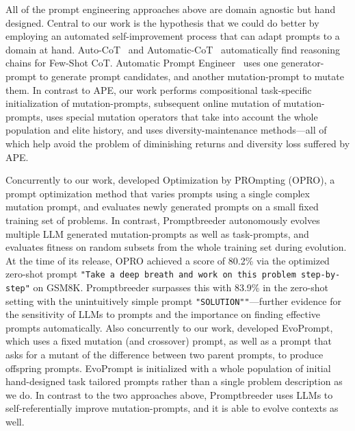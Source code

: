 \documentclass{article} %
\newcommand{\prompt}[1]{\footnotesize{\texttt{"#1"}}\normalsize}
\begin{document}
All of the prompt engineering approaches above are domain agnostic but hand designed. Central to our work is the hypothesis that we could do better by employing an automated self-improvement process that can adapt prompts to a domain at hand. Auto-CoT~\citep{DBLP:conf/iclr/0001Z0S23} and Automatic-CoT~\citep{DBLP:journals/corr/abs-2302-12822} automatically find reasoning chains for Few-Shot CoT. Automatic Prompt Engineer~\citep[APE,][]{zhou2022large} uses one generator-prompt to generate prompt candidates, and another mutation-prompt to mutate them. In contrast to APE, our work performs compositional task-specific initialization of mutation-prompts, subsequent online mutation of mutation-prompts, uses special mutation operators that take into account the whole population and elite history, and uses diversity-maintenance methods---all of which help avoid the problem of diminishing returns and diversity loss suffered by APE. 

Concurrently to our work, \cite{DBLP:journals/corr/abs-2309-03409} developed Optimization by PROmpting (OPRO), a prompt optimization method that varies prompts using a single complex mutation prompt, and evaluates newly generated prompts on a small fixed training set of problems. In contrast, Promptbreeder autonomously evolves multiple LLM generated mutation-prompts as well as task-prompts, and evaluates fitness on random subsets from the whole training set during evolution. At the time of its release, OPRO achieved a score of 80.2\% via the optimized zero-shot prompt \prompt{Take a deep breath and work on this problem step-by-step} on GSM8K. Promptbreeder surpasses this with 83.9\% in the zero-shot setting with the unintuitively simple prompt \prompt{SOLUTION"}---further evidence for the sensitivity of LLMs to prompts and the importance on finding effective prompts automatically. Also concurrently to our work, \cite{guo2023connecting} developed EvoPrompt, which uses a fixed mutation (and crossover) prompt, as well as a prompt that asks for a mutant of the difference between two parent prompts, to produce offspring prompts. EvoPrompt is initialized with a whole population of initial hand-designed task tailored prompts rather than a single problem description as we do. In contrast to the two approaches above, Promptbreeder uses LLMs to self-referentially improve mutation-prompts, and it is able to evolve contexts as well. 
\end{document}

